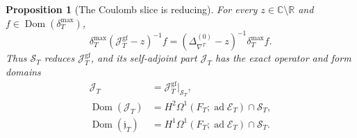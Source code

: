\documentclass[11pt]{article}
\newtheorem{proposition}[theorem]{Proposition}
\theoremstyle{definition}
\numberwithin{equation}{section}
\begin{document}
\begin{proposition}[The Coulomb slice is reducing]
\label{cusp-link-magnetic-reduction}
For every \(z\in\mathbb C\setminus\mathbb R\) and
\(f\in\operatorname{Dom}(\delta_T^{\max})\),
\begin{equation}
 \delta_T^{\max}(\mathcal J_T^{\mathrm{gf}}-z)^{-1}f
 =(\Delta_{\nabla^T}^{(0)}-z)^{-1}\delta_T^{\max}f.
 \label{cusp-link-magnetic-resolvent-intertwining}
\end{equation}
Thus \(\mathscr S_T\) reduces \(\mathcal J_T^{\mathrm{gf}}\), and its
self-adjoint part \(\mathcal J_T\) has the exact operator and form domains
\begin{equation}
 \begin{aligned}
 \mathcal J_T&=\mathcal J_T^{\mathrm{gf}}|_{\mathscr S_T},\\
 \operatorname{Dom}(\mathcal J_T)
 &=H^2\Omega^1(F_T;\operatorname{ad}\mathscr E_T)\cap\mathscr S_T,\\
 \operatorname{Dom}(\mathfrak j_T)
 &=H^1\Omega^1(F_T;\operatorname{ad}\mathscr E_T)\cap\mathscr S_T.
 \end{aligned}
 \label{cusp-link-magnetic-reduced-domains}
\end{equation}
\end{proposition}
\end{document}
